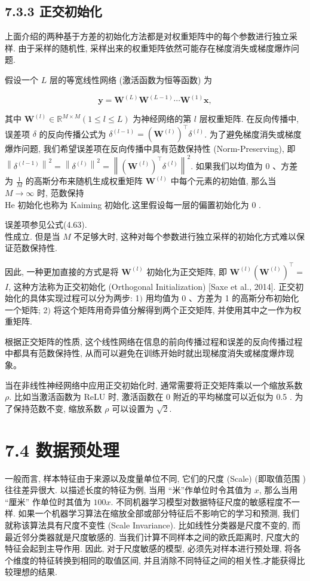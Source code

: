 \documentclass[10pt]{article}
\begin{document}
\subsection*{7.3.3 正交初始化}
上面介绍的两种基于方差的初始化方法都是对权重矩阵中的每个参数进行独立采样. 由于采样的随机性, 采样出来的权重矩阵依然可能存在梯度消失或梯度爆炸问题.

假设一个 $L$ 层的等宽线性网络 (激活函数为恒等函数) 为


\begin{equation*}
\boldsymbol{y}=\boldsymbol{W}^{(L)} \boldsymbol{W}^{(L-1)} \cdots \boldsymbol{W}^{(1)} \boldsymbol{x}, \tag{7.46}
\end{equation*}


其中 $\boldsymbol{W}^{(l)} \in \mathbb{R}^{M \times M}(1 \leq l \leq L)$ 为神经网络的第 $l$ 层权重矩阵. 在反向传播中,误差项 $\delta$ 的反向传播公式为 $\delta^{(l-1)}=\left(\boldsymbol{W}^{(l)}\right)^{\top} \delta^{(l)}$. 为了避免梯度消失或梯度爆炸问题, 我们希望误差项在反向传播中具有范数保持性 (Norm-Preserving), 即 $\left\|\delta^{(l-1)}\right\|^{2}=\left\|\delta^{(l)}\right\|^{2}=\left\|\left(\boldsymbol{W}^{(l)}\right)^{\top} \delta^{(l)}\right\|^{2}$. 如果我们以均值为 0 、方差为 $\frac{1}{M}$ 的高斯分布来随机生成权重矩阵 $\boldsymbol{W}^{(l)}$ 中每个元素的初始值, 那么当 $M \rightarrow \infty$ 时, 范数保持\\
He 初始化也称为 Kaiming 初始化.这里假设每一层的偏置初始化为 0 .

误差项参见公式(4.63).\\
性成立. 但是当 $M$ 不足够大时, 这种对每个参数进行独立采样的初始化方式难以保证范数保持性.

因此, 一种更加直接的方式是将 $\boldsymbol{W}^{(l)}$ 初始化为正交矩阵, 即 $\boldsymbol{W}^{(l)}\left(\boldsymbol{W}^{(l)}\right)^{\top}=$ $I$, 这种方法称为正交初始化 (Orthogonal Initialization) [Saxe et al., 2014]. 正交初始化的具体实现过程可以分为两步: 1$)$ 用均值为 0 、方差为 1 的高斯分布初始化一个矩阵; 2$)$ 将这个矩阵用奇异值分解得到两个正交矩阵, 并使用其中之一作为权重矩阵.

根据正交矩阵的性质, 这个线性网络在信息的前向传播过程和误差的反向传播过程中都具有范数保持性, 从而可以避免在训练开始时就出现梯度消失或梯度爆炸现象。

当在非线性神经网络中应用正交初始化时, 通常需要将正交矩阵乘以一个缩放系数 $\rho$. 比如当激活函数为 ReLU 时, 激活函数在 0 附近的平均梯度可以近似为 0.5 . 为了保持范数不变, 缩放系数 $\rho$ 可以设置为 $\sqrt{2}$.

\section*{7.4 数据预处理}
一般而言, 样本特征由于来源以及度量单位不同, 它们的尺度 (Scale) (即取值范围 ) 往往差异很大. 以描述长度的特征为例, 当用 “米”作单位时令其值为 $x$, 那么当用 “厘米” 作单位时其值为 $100 x$. 不同机器学习模型对数据特征尺度的敏感程度不一样. 如果一个机器学习算法在缩放全部或部分特征后不影响它的学习和预测, 我们就称该算法具有尺度不变性 (Scale Invariance). 比如线性分类器是尺度不变的, 而最近邻分类器就是尺度敏感的. 当我们计算不同样本之间的欧氏距离时, 尺度大的特征会起到主导作用. 因此, 对于尺度敏感的模型, 必须先对样本进行预处理, 将各个维度的特征转换到相同的取值区间, 并且消除不同特征之间的相关性,才能获得比较理想的结果.
\end{document}
